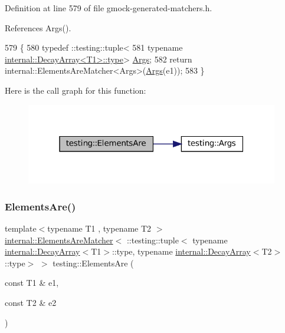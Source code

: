 Definition at line 579 of file gmock-\/generated-\/matchers.\+h.



References Args().


\begin{DoxyCode}
579                           \{
580   typedef ::testing::tuple<
581       \textcolor{keyword}{typename} \hyperlink{namespacegenerate__debs_a50bc9a7ecac9584553e089a448bcde58}{internal::DecayArray<T1>::type}> 
      \hyperlink{namespacetesting_a09ac462e8d6ed468cbfaa9c767aee0aa}{Args};
582   \textcolor{keywordflow}{return} internal::ElementsAreMatcher<Args>(\hyperlink{namespacetesting_a09ac462e8d6ed468cbfaa9c767aee0aa}{Args}(e1));
583 \}
\end{DoxyCode}
Here is the call graph for this function\+:
\nopagebreak
\begin{figure}[H]
\begin{center}
\leavevmode
\includegraphics[width=313pt]{namespacetesting_aa35aa6c9638d989e9f4aaa6009f60589_cgraph}
\end{center}
\end{figure}
\mbox{\label{namespacetesting_a864f77fe7774308d4c54f1f52f9040cf}} 
\subsubsection{\texorpdfstring{Elements\+Are()}{ElementsAre()}\hspace{0.1cm}{\footnotesize\ttfamily [3/11]}}
{\footnotesize\ttfamily template$<$typename T1 , typename T2 $>$ \\
\hyperlink{classtesting_1_1internal_1_1ElementsAreMatcher}{internal\+::\+Elements\+Are\+Matcher}$<$ \+::testing\+::tuple$<$ typename \hyperlink{structtesting_1_1internal_1_1DecayArray}{internal\+::\+Decay\+Array}$<$T1$>$\+::type, typename \hyperlink{structtesting_1_1internal_1_1DecayArray}{internal\+::\+Decay\+Array}$<$T2$>$\+::type$>$ $>$ testing\+::\+Elements\+Are (\begin{DoxyParamCaption}\item[{const T1 \&}]{e1,  }\item[{const T2 \&}]{e2 }\end{DoxyParamCaption})\hspace{0.3cm}{\ttfamily [inline]}}



